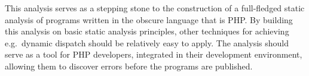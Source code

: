 This analysis serves as a stepping stone to the construction of a full-fledged static analysis of programs written in the obscure language that is PHP. By building this analysis on basic static analysis principles, other techniques for achieving e.g.\ dynamic dispatch should be relatively easy to apply. The analysis should serve as a tool for PHP developers, integrated in their development environment, allowing them to discover errors before the programs are published. 






 
 
 

